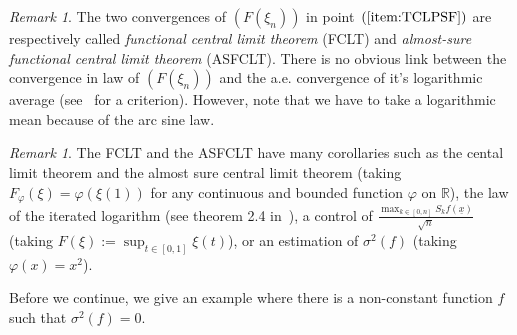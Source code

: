 \documentclass[11pt]{amsart}
\theoremstyle{definition}
\theoremstyle{remark}
\newtheorem{remark}[theorem]{Remark}
\numberwithin{equation}{section}
\begin{document}
\begin{remark}
The two convergences of $(F(\xi_n))$ in point~$(\ref{item:TCLPSF})$ are respectively called \emph{functional central limit theorem} (FCLT) and \emph{almost-sure functional central limit theorem} (ASFCLT). There is no obvious link between the convergence in law of $(F(\xi_n))$ and the a.e. convergence of it's logarithmic average (see~\cite{BC01} for a criterion). However, note that we have to take a logarithmic mean because of the arc sine law.
\end{remark}

\begin{remark}
The FCLT and the ASFCLT have many corollaries such as the cental limit theorem and the almost sure central limit theorem (taking $F_\varphi(\xi) = \varphi(\xi(1))$ for any continuous and bounded function $\varphi$ on ${\mathbb R}$), the law of the iterated logarithm (see theorem 2.4 in~\cite{Cha96}), a control of $\frac {\max_{k \in [0,n]}S_kf(\underline{x})}{\sqrt n}$ (taking $F(\xi) :=\sup_{t\in [0,1]} \xi(t)$), or an estimation of $\sigma^2(f)$ (taking $\varphi(x) = x^2$).
\end{remark}

Before we continue, we give an example where there is a non-constant function $f$ such that $\sigma^2(f)=0$.
\end{document}
